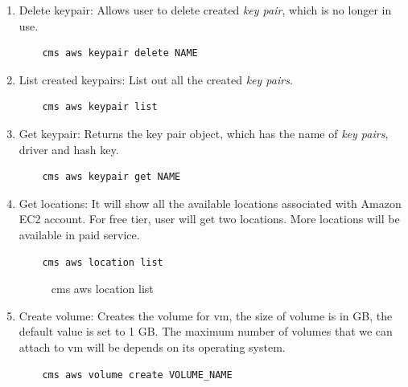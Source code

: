\documentclass[9pt,twocolumn,twoside]{../../styles/osajnl}
\begin{document}
\begin{enumerate}
    \item Delete keypair: Allows user to delete created \textit{key pair}, which is no longer in use.
    
    \begin{verbatim}
    cms aws keypair delete NAME
    \end{verbatim}
    
    \item List created keypairs: List out all the created \textit{key pairs}.
    
    \begin{verbatim}
    cms aws keypair list
    \end{verbatim}
    
    \item Get keypair: Returns the key pair object, which has the name of \textit{key pairs}, driver and hash key.
    
    \begin{verbatim}
    cms aws keypair get NAME
    \end{verbatim}
    
    
    \item Get locations: It will show all the available locations associated with Amazon EC2 account. For free tier, user will get two locations. More locations will be available in paid service.
    
    \begin{verbatim}
    cms aws location list
    \end{verbatim}
    
    \begin{figure}[h!]
    	\centering
    	\caption{cms aws location list}
    	\label{fig:locationlist}
    \end{figure}

    \item Create volume: Creates the volume for vm, the size of volume is in GB, the default value is set to 1 GB. The maximum number of volumes that we can attach to vm will be depends on its operating system.
    
    \begin{verbatim}
    cms aws volume create VOLUME_NAME
    \end{verbatim}
    

\end{enumerate}
\end{document}
